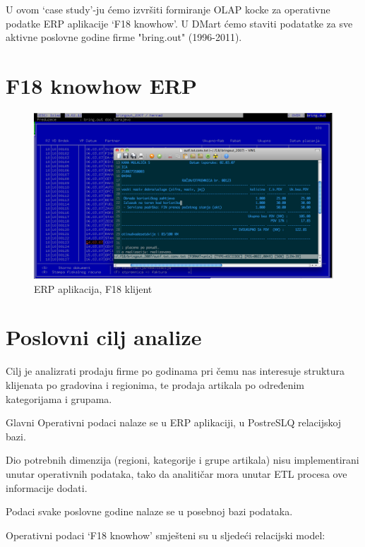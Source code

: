 \documentclass[times, utf8, seminar]{fit}
\begin{document}
U ovom `case study'-ju ćemo izvršiti formiranje OLAP kocke za operativne podatke ERP aplikacije `F18 knowhow'. U DMart ćemo staviti podatatke za sve aktivne poslovne godine firme "bring.out" (1996-2011). 

\section{F18 knowhow ERP}

\begin{figure}[H]
\centering
\includegraphics[width=15cm]{img/F18_erp.png}
\caption{ERP aplikacija, F18 klijent}
\end{figure}

\section{Poslovni cilj analize}

Cilj je analizrati prodaju firme po godinama pri čemu nas interesuje struktura klijenata po gradovina i regionima, te prodaja artikala po određenim kategorijama i grupama.

Glavni Operativni podaci nalaze se u ERP aplikaciji, u PostreSLQ relacijskoj bazi. 

Dio potrebnih dimenzija (regioni, kategorije i grupe artikala) nisu implementirani unutar operativnih podataka, tako da analitičar mora unutar ETL procesa ove informacije dodati. 

Podaci svake poslovne godine nalaze se u posebnoj bazi podataka.

Operativni podaci `F18 knowhow' smješteni su u sljedeći relacijski model:
\end{document}
